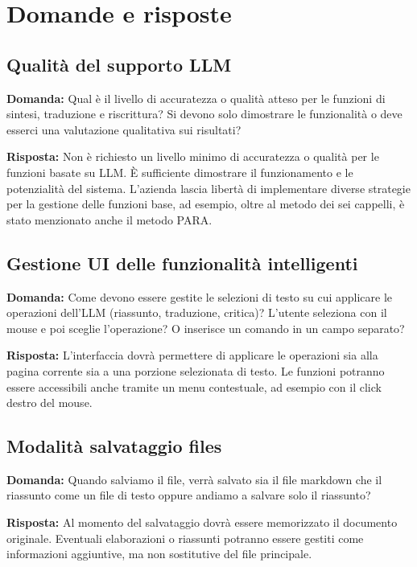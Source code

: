 \documentclass[a4paper,12pt]{article}
\begin{document}
\section{Domande e risposte}{

    \subsection{Qualità del supporto LLM}
    \textbf{Domanda:} Qual è il livello di accuratezza o qualità atteso per le funzioni di sintesi, traduzione e riscrittura? Si devono solo dimostrare le funzionalità o deve esserci una valutazione qualitativa sui risultati?

    \textbf{Risposta:} Non è richiesto un livello minimo di accuratezza o qualità per le funzioni basate su LLM. È sufficiente dimostrare il funzionamento e le potenzialità del sistema. L’azienda lascia libertà di implementare diverse strategie per la gestione delle funzioni base, ad esempio, oltre al metodo dei sei cappelli, è stato menzionato anche il metodo PARA.

    \subsection{Gestione UI delle funzionalità intelligenti}
    \textbf{Domanda:} Come devono essere gestite le selezioni di testo su cui applicare le operazioni dell’LLM (riassunto, traduzione, critica)? L’utente seleziona con il mouse e poi sceglie l’operazione? O inserisce un comando in un campo separato?

    \textbf{Risposta:} L’interfaccia dovrà permettere di applicare le operazioni sia alla pagina corrente sia a una porzione selezionata di testo. Le funzioni potranno essere accessibili anche tramite un menu contestuale, ad esempio con il click destro del mouse.

    \subsection{Modalità salvataggio files}
    \textbf{Domanda:} Quando salviamo il file, verrà salvato sia il file markdown che il riassunto come un file di testo oppure andiamo a salvare solo il riassunto?

    \textbf{Risposta:} Al momento del salvataggio dovrà essere memorizzato il documento originale. Eventuali elaborazioni o riassunti potranno essere gestiti come informazioni aggiuntive, ma non sostitutive del file principale.

}
\end{document}

